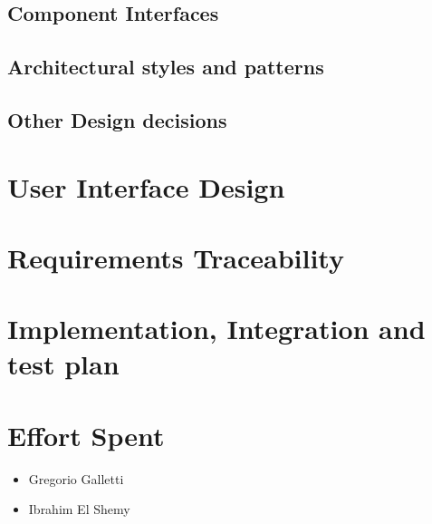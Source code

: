 \documentclass[11pt]{article} %
\begin{document}
\subsection{Component Interfaces}
\subsection{Architectural styles and patterns}
\subsection{Other Design decisions}

\section{User Interface Design}

\section{Requirements Traceability}

\section{Implementation, Integration and test plan}

\section{Effort Spent}
\begin{itemize}

\item Gregorio Galletti
\begin{center}
	\begin{table}[H]
	\noindent{}
	\end{table}
\end{center}

\item Ibrahim El Shemy
\begin{center}
	\begin{table}[H]
	\noindent{}
	\end{table}
\end{center}

\end{itemize}
\end{document}
